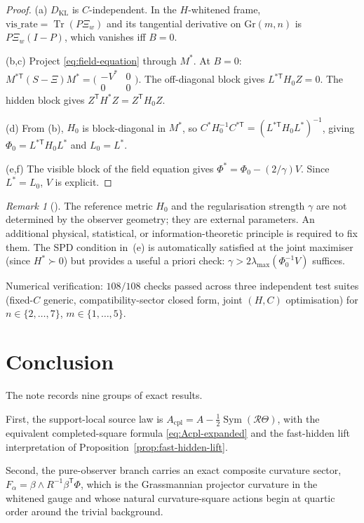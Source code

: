 \documentclass[11pt,a4paper]{article}
\numberwithin{equation}{section}
\DeclareMathOperator{\Tr}{Tr}
\DeclareMathOperator{\Sym}{Sym}
\theoremstyle{thmcompact}
\theoremstyle{remark}
\newtheorem*{remarkplain}{Remark}
\newenvironment{remark}[1][]%
{\begin{remarkbox}\begin{remarkplain}[#1]\normalfont}
{\end{remarkplain}\end{remarkbox}}
\begin{document}
\begin{proof}
(a) $D_{\mathrm{KL}}$ is $C$-independent.  In the $H$-whitened frame, $\mathrm{vis\_rate}=\Tr(P\Xi_w)$ and its tangential derivative on $\mathrm{Gr}(m,n)$ is $P\Xi_w(I{-}P)$, which vanishes iff $B=0$.

(b,c) Project \eqref{eq:field-equation} through $M^*$.  At $B=0$: $M^{*\mathsf T}(S{-}\Xi)M^*=\bigl(\begin{smallmatrix}-V^*&0\\0&0\end{smallmatrix}\bigr)$.  The off-diagonal block gives $L^{*\mathsf T}H_0 Z=0$.  The hidden block gives $Z^{\mathsf T}H^*Z=Z^{\mathsf T}H_0 Z$.

(d) From (b), $H_0$ is block-diagonal in $M^*$, so $C^*H_0^{-1}C^{*\mathsf T}=(L^{*\mathsf T}H_0L^*)^{-1}$, giving $\Phi_0=L^{*\mathsf T}H_0L^*$ and $L_0=L^*$.

(e,f) The visible block of the field equation gives $\Phi^*=\Phi_0-(2/\gamma)V$.  Since $L^*=L_0$, $V$ is explicit.
\end{proof}

\begin{remark}
The reference metric $H_0$ and the regularisation strength $\gamma$ are not determined by the observer geometry; they are external parameters.  An additional physical, statistical, or information-theoretic principle is required to fix them.  The \textup{SPD} condition in~(e) is automatically satisfied at the joint maximiser (since $H^*\succ 0$) but provides a useful a priori check: $\gamma>2\lambda_{\max}(\Phi_0^{-1}V)$ suffices.
\end{remark}

Numerical verification: $108/108$ checks passed across three independent test suites (fixed-$C$ generic, compatibility-sector closed form, joint $(H,C)$ optimisation) for $n\in\{2,\dots,7\}$, $m\in\{1,\dots,5\}$.

\section{Conclusion}

The note records nine groups of exact results.

First, the support-local source law is $A_{\mathrm{cpl}}=A-\frac12\Sym(\mathcal R\Theta)$, with the equivalent completed-square formula \eqref{eq:Acpl-expanded} and the fast-hidden lift interpretation of Proposition~\ref{prop:fast-hidden-lift}.

Second, the pure-observer branch carries an exact composite curvature sector, $F_{\alpha}=\beta\wedge R^{-1}\beta^{\mathsf T}\Phi$, which is the Grassmannian projector curvature in the whitened gauge and whose natural curvature-square actions begin at quartic order around the trivial background.
\end{document}
